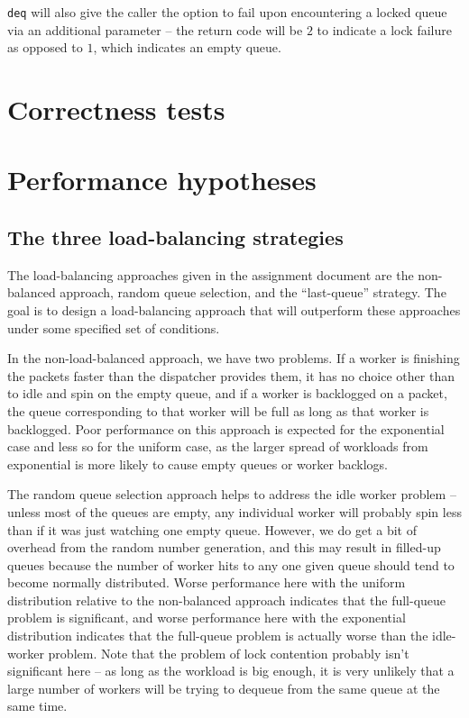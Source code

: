 \documentclass{article}
\begin{document}
\verb|deq| will also give the caller the option to fail upon encountering a locked queue via an additional parameter -- the return code will be $2$ to indicate a lock failure as opposed to $1$, which indicates an empty queue.
\section*{Correctness tests}
\section*{Performance hypotheses}
\subsection*{The three load-balancing strategies}
The load-balancing approaches given in the assignment document are the non-balanced approach, random queue selection, and the ``last-queue'' strategy. The goal is to design a load-balancing approach that will outperform these approaches under some specified set of conditions. 

In the non-load-balanced approach, we have two problems. If a worker is finishing the packets faster than the dispatcher provides them, it has no choice other than to idle and spin on the empty queue, and if a worker is backlogged on a packet, the queue corresponding to that worker will be full as long as that worker is backlogged. Poor performance on this approach is expected for the exponential case and less so for the uniform case, as the larger spread of workloads from exponential is more likely to cause empty queues or worker backlogs.

The random queue selection approach helps to address the idle worker problem -- unless most of the queues are empty, any individual worker will probably spin less than if it was just watching one empty queue. However, we do get a bit of overhead from the random number generation, and this may result in filled-up queues because the number of worker hits to any one given queue should tend to become normally distributed. Worse performance here with the uniform distribution relative to the non-balanced approach indicates that the full-queue problem is significant, and worse performance here with the exponential distribution indicates that the full-queue problem is actually worse than the idle-worker problem. Note that the problem of lock contention probably isn't significant here -- as long as the workload is big enough, it is very unlikely that a large number of workers will be trying to dequeue from the same queue at the same time.
\end{document}
